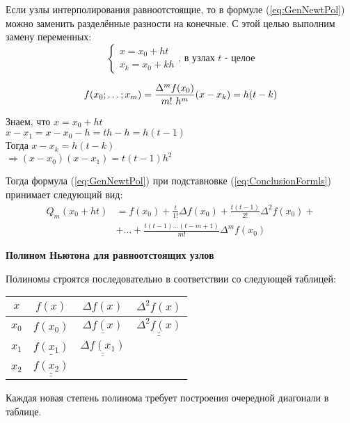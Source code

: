 \documentclass[a4paper,11pt]{article}
\begin{document}
Если узлы интерполирования равноотстоящие, то в формуле (\ref{eq:GenNewtPol}) можно заменить разделённые разности на конечные. С этой целью выполним замену переменных:
\begin{equation*}
  \begin{cases}
    x = x_0 + ht \\
    x_k = x_0 + kh
  \end{cases}, \, \text{в узлах $t$ - целое}
\end{equation*}

\begin{equation}
  f(x_0; \dots; x_m) = \frac{\Delta^mf(x_0)}{m!\ h^m} \\
  (x - x_k) = h(t - k)
  \label{eq:ConclusionFormls}
\end{equation}

\begin{flushright}
  \footnotesize {
    Знаем, что $x = x_0 + ht$ \\
    $x-x_1 = x-x_0-h = th-h = h(t-1)$ \\
    Тогда $x-x_k = h(t-k)$ \\
    $\Rightarrow (x-x_0)(x-x_1) = t(t-1)h^2$ }
\end{flushright}

Тогда формула (\ref{eq:GenNewtPol}) при подставновке (\ref{eq:ConclusionFormls}) принимает следующий вид:
\begin{align*}
  Q_m(x_0 + ht) & = f(x_0) + \frac{t}{1!}\Delta f(x_0) + \frac{t(t-1)}{2!}\Delta^2f(x_0) + \\
                & + \dots + \frac{t(t-1)\dots(t-m+1)}{m!}\Delta^mf(x_0)
\end{align*}
  \begin{center}
  \textbf{Полином Ньютона для равноотстоящих узлов}
\end{center}

\vspace{5mm}
Полиномы строятся последовательно в соответствии со следующей таблицей:

\begin{minipage}{\linewidth}
  \begin{wraptable}{l}{6cm}
    \begin{tabular}{ c|c|c|c }
      $x$ & $f(x)$ & $\Delta f(x)$ & $\Delta^2f(x)$ \\
      \hline
      $x_0$ & $f(x_0)$ & $\underline{\Delta f(x)}$ & $\underline{\underline{\Delta^2f(x)}}$ \\
      $x_1$ & $\underline{f(x_1)}$ & $\underline{\underline{\Delta f(x_1)}}$ & \\
      $x_2$ & $\underline{\underline{f(x_2)}}$ & &
    \end{tabular}
  \end{wraptable}
    Каждая новая степень полинома требует построения очередной диагонали в таблице.
\end{minipage}
\end{document}
